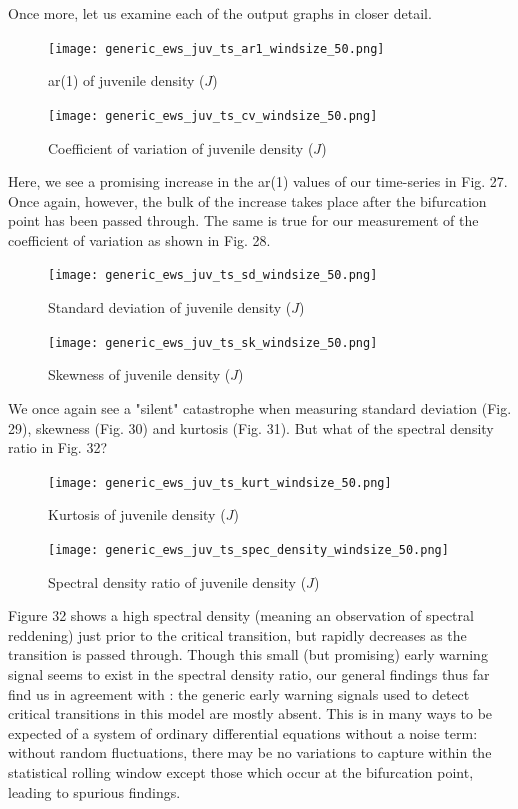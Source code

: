 \documentclass[12pt]{article}
\begin{document}
Once more, let us examine each of the output graphs in closer detail.

\begin{figure}[!htb]
\begin{centering}
  \texttt{[image: generic\_ews\_juv\_ts\_ar1\_windsize\_50.png]}
  \caption{ar(1) of juvenile density ($J$)} 
\endminipage\hfill
{}
  \texttt{[image: generic\_ews\_juv\_ts\_cv\_windsize\_50.png]}
  \caption{Coefficient of variation  of juvenile density ($J$)}
\endminipage\hfill
\end{centering}
\end{figure}
\FloatBarrier

Here, we see a promising increase in the ar(1) values of our time-series in Fig. 27. Once again, however, the bulk of the increase takes place after the bifurcation point has been passed through. The same is true for our measurement of the coefficient of variation as shown in Fig. 28.

\begin{figure}[!htb]
  \texttt{[image: generic\_ews\_juv\_ts\_sd\_windsize\_50.png]}
  \caption{Standard deviation of juvenile density ($J$)} 
\endminipage\hfill
{}
  \texttt{[image: generic\_ews\_juv\_ts\_sk\_windsize\_50.png]}
  \caption{Skewness of juvenile density ($J$)}
\endminipage\hfill
\end{figure}
\FloatBarrier

We once again see a "silent" catastrophe when measuring standard deviation (Fig. 29), skewness (Fig. 30) and kurtosis (Fig. 31). But what of the spectral density ratio in Fig. 32?


\begin{figure}[!htb]
\begin{centering}
  \texttt{[image: generic\_ews\_juv\_ts\_kurt\_windsize\_50.png]}
  \caption{Kurtosis of juvenile density ($J$)} 
\endminipage\hfill
{}
  \texttt{[image: generic\_ews\_juv\_ts\_spec\_density\_windsize\_50.png]}
  \caption{Spectral density ratio of juvenile density ($J$)}
\endminipage\hfill
\end{centering}
\end{figure}
\FloatBarrier

Figure 32 shows a high spectral density (meaning an observation of spectral reddening) just prior to the critical transition, but rapidly decreases as the transition is passed through. Though this small (but promising) early warning signal seems to exist in the spectral density ratio, our general findings thus far find us in agreement with \cite{Boerlijst2013}: the generic early warning signals used to detect critical transitions in this model are mostly absent. This is in many ways to be expected of a system of ordinary differential equations without a noise term: without random fluctuations, there may be no variations to capture within the statistical rolling window except those which occur at the bifurcation point, leading to spurious findings.\\
\end{document}
